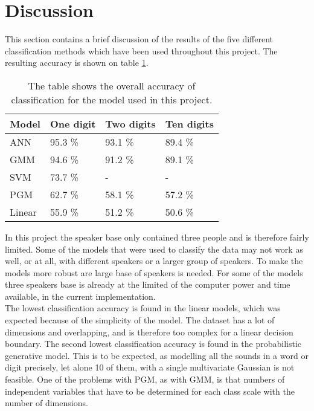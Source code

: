 \section*{Discussion}
This section contains a brief discussion of the results of the five different classification methods which have been used throughout this project. The resulting accuracy is shown on table \ref{table:result}.

\begin{table}[h]
\begin{tabular}{@{}l|lll@{}}
\toprule
Model 		   		   & One digit            & Two digits  & Ten digits   \\ \midrule
ANN                    & 95.3 \%                & 93.1 \%   & 89.4 \% \\
GMM                    & 94.6 \%                & 91.2 \%   & 89.1 \% \\
SVM                    & 73.7 \%                & - 	    & -       \\ 
PGM                    & 62.7 \% 				& 58.1 \%   & 57.2 \% \\
Linear                 & 55.9 \% 				& 51.2 \%   & 50.6 \%

\end{tabular}
\caption{The table shows the overall accuracy of classification for the model used in this project. }
\label{table:result}
\end{table}

In this project the speaker base only contained three people and is therefore fairly limited. 
Some of the models that were used to classify the data may not work as well, or at all, with different speakers or a larger group of speakers.
To make the models more robust are large base of speakers is needed.
For some of the models three speakers base is already at the limited of the computer power and time available, in the current implementation.\\

The lowest classification accuracy is found in the linear models, which was expected because of the simplicity of the model.
The dataset has a lot of dimensions and overlapping, and is therefore too complex for a linear decision boundary.
The second lowest classification accuracy is found in the probabilistic generative model. 
This is to be expected, as modelling all the sounds in a word or digit precisely, let alone 10 of them, with a single multivariate Gaussian is not feasible.
One of the problems with PGM, as with GMM, is that numbers of independent variables that have to be determined for each class scale with the number of dimensions.\\

